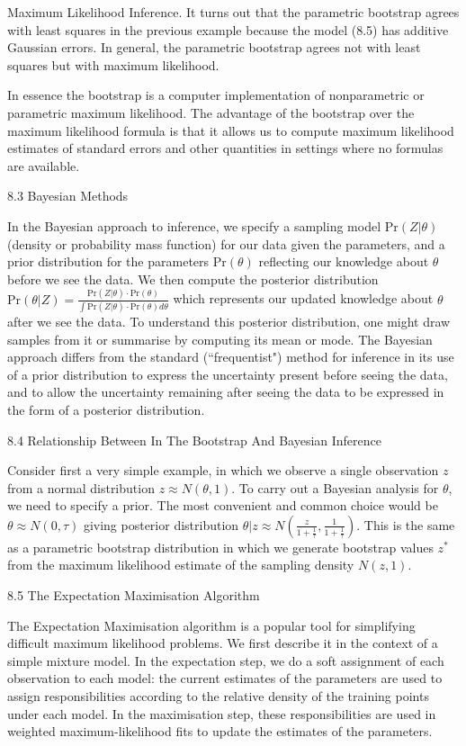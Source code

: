 Maximum Likelihood Inference. It turns out that the parametric bootstrap agrees with least squares in the previous example because the model (8.5) has additive Gaussian errors. In general, the parametric bootstrap agrees not with least squares but with maximum likelihood.

In essence the bootstrap is a computer implementation of nonparametric or parametric maximum likelihood. The advantage of the bootstrap over the maximum likelihood formula is that it allows us to compute maximum likelihood estimates of standard errors and other quantities in settings where no formulas are available.

8.3 Bayesian Methods

In the Bayesian approach to inference, we specify a sampling model $\text{Pr}(Z|\theta)$ (density or probability mass function) for our data given the parameters, and a prior distribution for the parameters $\text{Pr}(\theta)$ reflecting our knowledge about $\theta$ before we see the data. We then compute the posterior distribution $\text{Pr}(\theta |Z)=\frac{\text{Pr}(Z|\theta) \cdot \text{Pr}(\theta)}{\int \text{Pr}(Z|\theta) \cdot \text{Pr}(\theta)d\theta}$ which represents our updated knowledge about $\theta$ after we see the data. To understand this posterior distribution, one might draw samples from it or summarise by computing its mean or mode. The Bayesian approach differs from the standard (``frequentist") method for inference in its use of a prior distribution to express the uncertainty present before seeing the data, and to allow the uncertainty remaining after seeing the data to be expressed in the form of a posterior distribution.

8.4 Relationship Between In The Bootstrap And Bayesian Inference

Consider first a very simple example, in which we observe a single observation $z$ from a normal distribution $z \approx N(\theta,1)$. To carry out a Bayesian analysis for $\theta$, we need to specify a prior. The most convenient and common choice would be $\theta \approx N(0,\tau)$ giving posterior distribution $\theta |z \approx N\left(\frac{z}{1+\frac{1}{\tau}},\frac{1}{1+\frac{1}{\tau}} \right)$. This is the same as a parametric bootstrap distribution in which we generate bootstrap values $z^*$ from the maximum likelihood estimate of the sampling density $N(z,1)$.

8.5 The Expectation Maximisation Algorithm

The Expectation Maximisation algorithm is a popular tool for simplifying difficult maximum likelihood problems. We first describe it in the context of a simple mixture model. In the expectation step, we do a soft assignment of each observation to each model: the current estimates of the parameters are used to assign responsibilities according to the relative density of the training points under each model. In the maximisation step, these responsibilities are used in weighted maximum-likelihood fits to update the estimates of the parameters.

